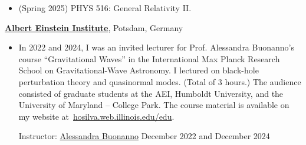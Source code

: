 \documentclass[10pt]{article}
\begin{document}
\begin{itemize}
    \item (Spring 2025) PHYS 516: General Relativity II.
\end{itemize}

\href{http://www.aei.mpg.de}{\textbf{Albert Einstein Institute}}, Potsdam, Germany

\begin{itemize}
    \item In 2022 and 2024, I was an invited lecturer for Prof. Alessandra Buonanno's course ``Gravitational Waves'' in the
    International Max Planck Research School on Gravitational-Wave Astronomy.
    I lectured on black-hole perturbation theory and quasinormal modes. (Total of 3 hours.) The audience consisted of graduate students at the AEI, Humboldt University, and the University of Maryland -- College Park.
    The course material is available on my website at~\href{https://hosilva.web.illinois.edu/edu}{hosilva.web.illinois.edu/edu}.

    Instructor: \href{https://www.aei.mpg.de/alessandra-buonanno}{Alessandra Buonanno} \hfill{December 2022 and December 2024}
\end{itemize}
\end{document}
